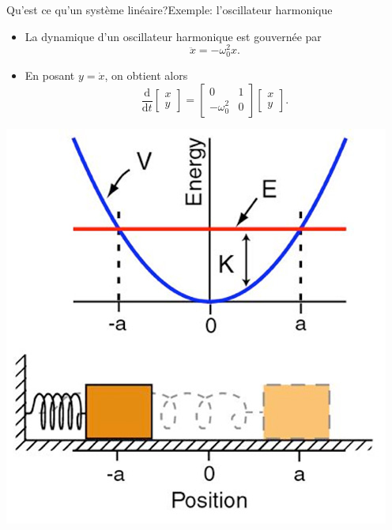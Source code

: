 \documentclass[usenames,dvipsnames,svgnames,10pt,aspectratio=169]{beamer}
\begin{document}
\begin{frame}[t, c]{Qu'est ce qu'un système linéaire?}{Exemple: l'oscillateur harmonique}
	\begin{minipage}{.48\textwidth}
		\begin{itemize}
			\item La dynamique d'un oscillateur harmonique est gouvernée par
			$$\ddot{x} = - \omega_0^2 x.$$

			\medskip

			\item En posant $y = \dot{x}$, on obtient alors
			$$\displaystyle \frac{\mathrm{d}}{\mathrm{d}t} \begin{bmatrix} x \\ y \end{bmatrix} = \begin{bmatrix} 0 & 1 \\ -\omega_0^2 & 0 \end{bmatrix} \begin{bmatrix} x \\ y \end{bmatrix}.$$
		\end{itemize}
	\end{minipage}%
	\hfill
	\begin{minipage}{.48\textwidth}
		\centering
		\includegraphics[width=.8\textwidth]{harmonic_oscillator}
	\end{minipage}

	\vspace{1cm}
\end{frame}
\end{document}
